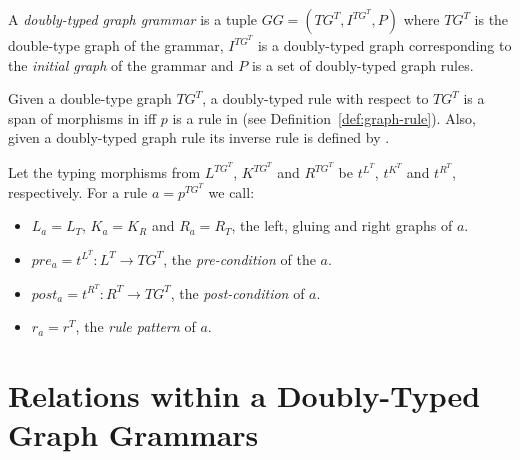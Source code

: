 \begin{definition} A \emph{doubly-typed graph grammar} is a tuple $GG = \left(TG^T, I^{TG^T},P \right)$ where $TG^T$ is the double-type graph of the grammar, $I^{TG^T}$ is a doubly-typed graph corresponding to the \emph{initial graph} of the grammar and $P$ is a set of doubly-typed graph rules. 
\end{definition}

\begin{definition} Given a double-type graph $TG^T$, a doubly-typed rule with respect to $TG^T$ is a span of morphisms \doublyTypedRule{} in \doublyTypedGraphCategory{} iff $p$ is a rule in \typedGraphCategory{} (see Definition~\ref{def:graph-rule}). Also, given a doubly-typed graph rule \doublyTypedRule{} its inverse rule is defined by \inverseDoublyTypedRule{}.

  Let the typing morphisms from $L^{TG^T}$, $K^{TG^T}$ and $R^{TG^T}$ be $t^{L^T}$, $t^{K^T}$ and $t^{R^T}$, respectively. For a rule $a = p^{TG^T}$ we call:

  \begin{itemize}
    \item $L_a = L_T$, $K_a = K_R$ and $R_a = R_T$, the left, gluing and right graphs of $a$.
    \item $pre_a = t^{L^T} : L^T \rightarrow TG^T$, the \emph{pre-condition} of the $a$.
    \item $post_a = t^{R^T} : R^T \rightarrow TG^T$, the \emph{post-condition} of $a$.
    \item $r_a = r^T$, the \emph{rule pattern} of $a$.
  \end{itemize}
\end{definition}

\section{Relations within a Doubly-Typed Graph Grammars}


